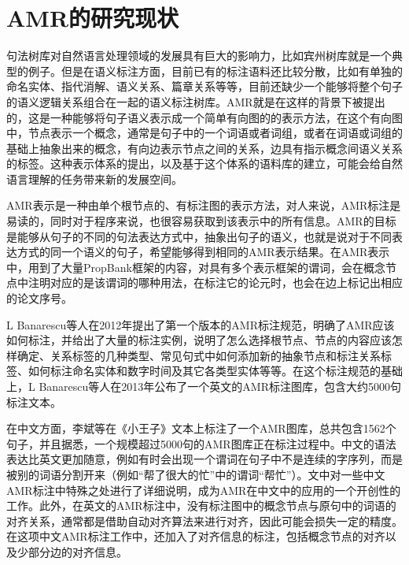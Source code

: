 \documentclass[master, winfont]{njuthesis}
\begin{document}
\section{AMR的研究现状}
句法树库对自然语言处理领域的发展具有巨大的影响力，比如宾州树库就是一个典型的例子。但是在语义标注方面，目前已有的标注语料还比较分散，比如有单独的命名实体、指代消解、语义关系、篇章关系等等，目前还缺少一个能够将整个句子的语义逻辑关系组合在一起的语义标注树库。AMR就是在这样的背景下被提出的，这是一种能够将句子语义表示成一个简单有向图的的表示方法，在这个有向图中，节点表示一个概念，通常是句子中的一个词语或者词组，或者在词语或词组的基础上抽象出来的概念，有向边表示节点之间的关系，边具有指示概念间语义关系的标签。这种表示体系的提出，以及基于这个体系的语料库的建立，可能会给自然语言理解的任务带来新的发展空间。

AMR表示是一种由单个根节点的、有标注图的表示方法\cite{Banarescu2013Abstract}，对人来说，AMR标注是易读的，同时对于程序来说，也很容易获取到该表示中的所有信息。AMR的目标是能够从句子的不同的句法表达方式中，抽象出句子的语义，也就是说对于不同表达方式的同一个语义的句子，希望能够得到相同的AMR表示结果。在AMR表示中，用到了大量PropBank框架的内容，对具有多个表示框架的谓词，会在概念节点中注明对应的是该谓词的哪种用法，在标注它的论元时，也会在边上标记出相应的论文序号。

L Banarescu等人\cite{banarescu2012abstract}在2012年提出了第一个版本的AMR标注规范，明确了AMR应该如何标注，并给出了大量的标注实例，说明了怎么选择根节点、节点的内容应该怎样确定、关系标签的几种类型、常见句式中如何添加新的抽象节点和标注关系标签、如何标注命名实体和数字时间及其它各类型实体等等。在这个标注规范的基础上，L Banarescu等人\cite{Banarescu2013Abstract}在2013年公布了一个英文的AMR标注图库，包含大约5000句标注文本。

在中文方面，李斌等\cite{Li2016Annotating}在《小王子》文本上标注了一个AMR图库，总共包含1562个句子，并且据悉，一个规模超过5000句的AMR图库正在标注过程中。中文的语法表达比英文更加随意，例如有时会出现一个谓词在句子中不是连续的字序列，而是被别的词语分割开来（例如“帮了很大的忙”中的谓词“帮忙”）。文中对一些中文AMR标注中特殊之处进行了详细说明，成为AMR在中文中的应用的一个开创性的工作。此外，在英文的AMR标注中，没有标注图中的概念节点与原句中的词语的对齐关系，通常都是借助自动对齐算法来进行对齐，因此可能会损失一定的精度。在这项中文AMR标注工作中，还加入了对齐信息的标注，包括概念节点的对齐以及少部分边的对齐信息。
\end{document}
